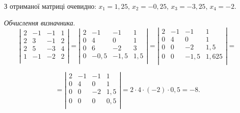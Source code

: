\documentclass[a4paper,oneside,DIV=12,12pt]{scrartcl}
\newcommand{\subproblem}[1]{\textit{#1}.}
\begin{document}
\begin{solution}
		З отриманої матриці очевидно: $x_1 = 1{,}25$, $x_2 = -0{,}25$, $x_3 = -3{,}25$, $x_4 = -2$.
		
		\subproblem{Обчислення визначника}
		\[
			\left|
			\begin{array}{rrrr}
				2 & -1 & -1 & 1 \\
				2 & 3  & -1 & 2 \\
				2 & 5  & -3 & 4 \\
				1 & -1 & -2 & 2 \\
			\end{array}
			\right|
			=
			\left|
			\begin{array}{rrrr}
				2 & -1     & -1     & 1 \\
				0 & 4      & 0      & 1 \\
				0 & 6      & -2     & 3 \\
				0 & -0{,}5 & -1{,}5 & 1{,}5 \\
			\end{array}
			\right|=
			\left|
			\begin{array}{rrrr}
				2 & -1     & -1     & 1 \\
				0 & 4      & 0      & 1 \\
				0 & 0      & -2     & 1{,}5 \\
				0 & 0      & -1{,}5 & 1{,}625 \\
			\end{array}
			\right|
			=
		\]
		
		\[
			=
			\left|
			\begin{array}{rrrr}
				2 & -1     & -1 & 1 \\
				0 & 4      & 0  & 1 \\
				0 & 0      & -2 & 1{,}5 \\
				0 & 0      & 0  & 0{,}5 \\
			\end{array}
			\right|
			= 2 \cdot 4 \cdot (-2) \cdot 0{,}5 = -8.
		\]
		

\end{solution}
\end{document}
